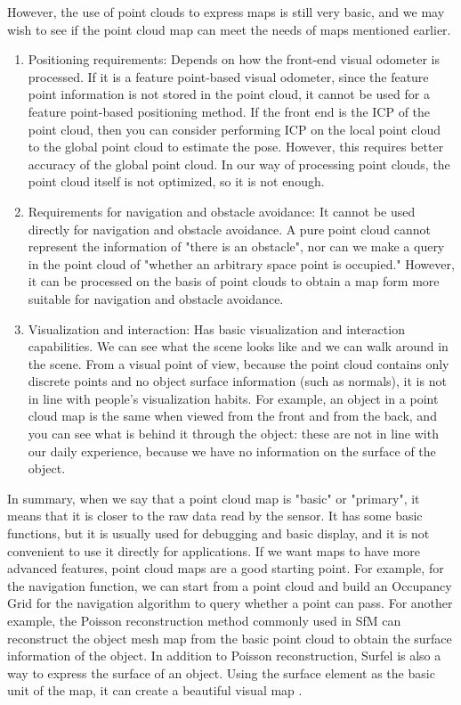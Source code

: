 However, the use of point clouds to express maps is still very basic, and we may wish to see if the point cloud map can meet the needs of maps mentioned earlier.
\enlargethispage{-3pt}
\begin{enumerate}
\item Positioning requirements: Depends on how the front-end visual odometer is processed. If it is a feature point-based visual odometer, since the feature point information is not stored in the point cloud, it cannot be used for a feature point-based positioning method. If the front end is the ICP of the point cloud, then you can consider performing ICP on the local point cloud to the global point cloud to estimate the pose. However, this requires better accuracy of the global point cloud. In our way of processing point clouds, the point cloud itself is not optimized, so it is not enough.
\item Requirements for navigation and obstacle avoidance: It cannot be used directly for navigation and obstacle avoidance. A pure point cloud cannot represent the information of "there is an obstacle", nor can we make a query in the point cloud of "whether an arbitrary space point is occupied." However, it can be processed on the basis of point clouds to obtain a map form more suitable for navigation and obstacle avoidance.
\item Visualization and interaction: Has basic visualization and interaction capabilities. We can see what the scene looks like and we can walk around in the scene. From a visual point of view, because the point cloud contains only discrete points and no object surface information (such as normals), it is not in line with people's visualization habits. For example, an object in a point cloud map is the same when viewed from the front and from the back, and you can see what is behind it through the object: these are not in line with our daily experience, because we have no information on the surface of the object.
\end{enumerate}

In summary, when we say that a point cloud map is "basic" or "primary", it means that it is closer to the raw data read by the sensor. It has some basic functions, but it is usually used for debugging and basic display, and it is not convenient to use it directly for applications. If we want maps to have more advanced features, point cloud maps are a good starting point. For example, for the navigation function, we can start from a point cloud and build an Occupancy Grid for the navigation algorithm to query whether a point can pass. For another example, the Poisson reconstruction \textsuperscript{\cite{Kazhdan2006}} method commonly used in SfM can reconstruct the object mesh map from the basic point cloud to obtain the surface information of the object. In addition to Poisson reconstruction, Surfel is also a way to express the surface of an object. Using the surface element as the basic unit of the map, it can create a beautiful visual map \textsuperscript{\cite{Stuckler2014}}.

